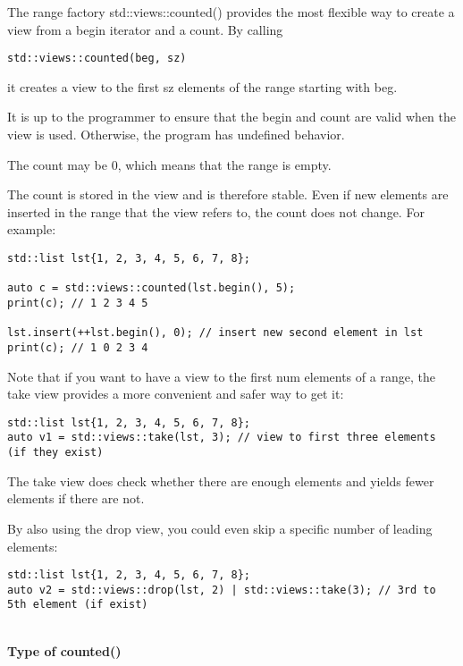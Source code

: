 The range factory std::views::counted() provides the most flexible way to create a view from a begin iterator and a count. By calling

\begin{lstlisting}[style=styleCXX]
std::views::counted(beg, sz)
\end{lstlisting}

it creates a view to the first sz elements of the range starting with beg.

It is up to the programmer to ensure that the begin and count are valid when the view is used. Otherwise, the program has undefined behavior.

The count may be 0, which means that the range is empty.

The count is stored in the view and is therefore stable. Even if new elements are inserted in the range that the view refers to, the count does not change. For example:

\begin{lstlisting}[style=styleCXX]
std::list lst{1, 2, 3, 4, 5, 6, 7, 8};

auto c = std::views::counted(lst.begin(), 5);
print(c); // 1 2 3 4 5

lst.insert(++lst.begin(), 0); // insert new second element in lst
print(c); // 1 0 2 3 4
\end{lstlisting}

Note that if you want to have a view to the first num elements of a range, the take view provides a more convenient and safer way to get it:

\begin{lstlisting}[style=styleCXX]
std::list lst{1, 2, 3, 4, 5, 6, 7, 8};
auto v1 = std::views::take(lst, 3); // view to first three elements (if they exist)
\end{lstlisting}

The take view does check whether there are enough elements and yields fewer elements if there are not.

By also using the drop view, you could even skip a specific number of leading elements:

\begin{lstlisting}[style=styleCXX]
std::list lst{1, 2, 3, 4, 5, 6, 7, 8};
auto v2 = std::views::drop(lst, 2) | std::views::take(3); // 3rd to 5th element (if exist)
\end{lstlisting}

\noindent
\hspace*{\fill} \\ %
\textbf{Type of counted()}

